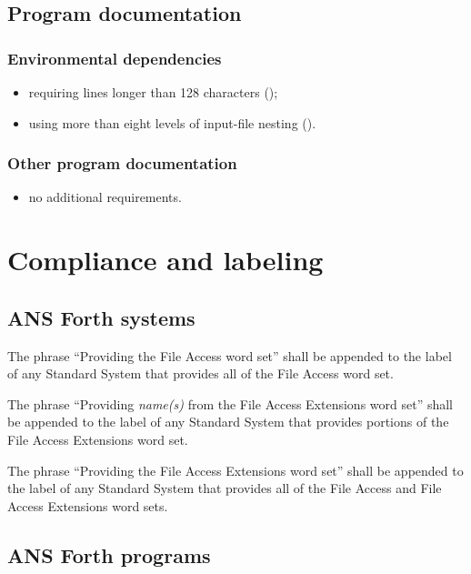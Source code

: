 \subsection{Program documentation} %

\subsubsection{Environmental dependencies} %
\begin{itemize}
\item requiring lines longer than 128 characters
	();
\item using more than eight levels of input-file nesting
	().
\end{itemize}

\subsubsection{Other program documentation} %
\begin{itemize}
\item no additional requirements.
\end{itemize}

\section{Compliance and labeling} %

\subsection{ANS Forth systems} %

The phrase ``Providing the File Access word set'' shall be appended
to the label of any Standard System that provides all of the File
Access word set.

The phrase ``Providing \emph{name(s)} from the File Access Extensions
word set'' shall be appended to the label of any Standard System that
provides portions of the File Access Extensions word set.

The phrase ``Providing the File Access Extensions word set'' shall
be appended to the label of any Standard System that provides all of
the File Access and File Access Extensions word sets.

\subsection{ANS Forth programs} %

